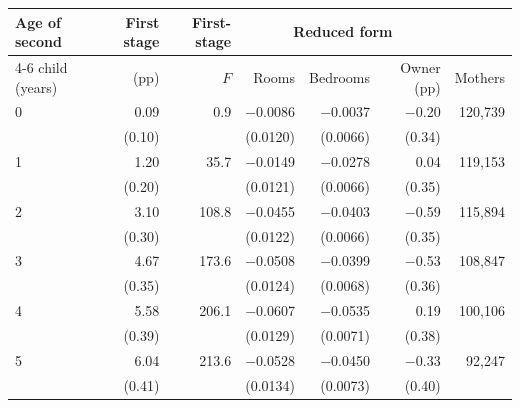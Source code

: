 \setlength{\tabcolsep}{5pt}
\begin{tabular}{@{}lrrrrrr@{}}
\toprule
Age of second & First stage & First-stage & \multicolumn{3}{c}{Reduced form} & \\
\cmidrule(lr){4-6}
child (years) & (pp) & $F$ & Rooms & Bedrooms & Owner (pp) & Mothers \\
\midrule
0 & 0.09 & 0.9 & $-$0.0086 & $-$0.0037 & $-$0.20 & 120,739 \\
 & (0.10) & & (0.0120) & (0.0066) & (0.34) & \\
1 & 1.20 & 35.7 & $-$0.0149 & $-$0.0278 & 0.04 & 119,153 \\
 & (0.20) & & (0.0121) & (0.0066) & (0.35) & \\
2 & 3.10 & 108.8 & $-$0.0455 & $-$0.0403 & $-$0.59 & 115,894 \\
 & (0.30) & & (0.0122) & (0.0066) & (0.35) & \\
3 & 4.67 & 173.6 & $-$0.0508 & $-$0.0399 & $-$0.53 & 108,847 \\
 & (0.35) & & (0.0124) & (0.0068) & (0.36) & \\
4 & 5.58 & 206.1 & $-$0.0607 & $-$0.0535 & 0.19 & 100,106 \\
 & (0.39) & & (0.0129) & (0.0071) & (0.38) & \\
5 & 6.04 & 213.6 & $-$0.0528 & $-$0.0450 & $-$0.33 & 92,247 \\
 & (0.41) & & (0.0134) & (0.0073) & (0.40) & \\
\bottomrule
\end{tabular}
